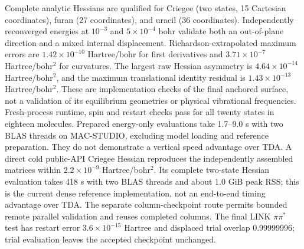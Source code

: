 Complete analytic Hessians are qualified for Criegee (two states,
15 Cartesian coordinates), furan (27 coordinates), and uracil (36 coordinates).
Independently reconverged energies at $10^{-3}$ and $5\times10^{-4}$ bohr
validate both an out-of-plane direction and a mixed internal displacement.
Richardson-extrapolated maximum errors are $1.42\times10^{-10}$ Hartree/bohr for
first derivatives and $3.71\times10^{-7}$ Hartree/bohr$^2$ for curvatures.
The largest raw Hessian asymmetry is $4.64\times10^{-14}$ Hartree/bohr$^2$, and the
maximum translational identity residual is $1.43\times10^{-13}$ Hartree/bohr$^2$.
These are implementation checks of the final anchored surface, not a
validation of its equilibrium geometries or physical vibrational frequencies.
Fresh-process runtime, spin and restart checks pass for all twenty states
in eighteen molecules. Prepared energy-only evaluations take 1.7--9.0 s
with two BLAS threads on MAC-STUDIO, excluding model loading and reference
preparation. They do not demonstrate a vertical speed advantage over TDA.
A direct cold public-API Criegee Hessian reproduces the independently
assembled matrices within $2.2\times10^{-9}$ Hartree/bohr$^2$.
Its complete two-state Hessian evaluation takes 418 s with two BLAS threads
and about 1.0 GiB peak RSS; this is the current dense reference implementation,
not an end-to-end timing advantage over TDA. The separate column-checkpoint
route permits bounded remote parallel validation and reuses completed columns.
The final LINK $\pi\pi^*$ test has restart error
$3.6\times10^{-15}$ Hartree and displaced trial overlap 0.99999996;
trial evaluation leaves the accepted checkpoint unchanged.

